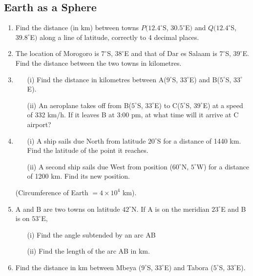 	
	
	\subsection{Earth as a Sphere}
\begin{enumerate}
	\item Find the distance (in km) between towns $P(12.4^\circ$S, $30.5^\circ$E$)$ and $Q(12.4^\circ$S, $39.8^\circ$E$)$ along a line of latitude, correctly to 4 decimal places.

	\item The location of Morogoro is $7^\circ$S, $38^\circ$E and that of Dar es Salaam is $7^\circ$S, $39^\circ$E. Find the distance between the two towns in kilometres.
	
	\item 
		\begin{itemize}
		\item[(i)] Find the distance in kilometres between A($9^\circ$S, $33^\circ$E) and B($5^\circ$S, $33^\circ$E).
		\item[(ii)] An aeroplane takes off from B($5^\circ$S, $33^\circ$E) to C($5^\circ$S, $39^\circ$E) at a speed of 332 km\slash h. If it leaves B at 3:00 pm, at what time will it arrive at C airport?
		\end{itemize}

	\item 
		\begin{itemize}
		\item[(i)] A ship sails due North from latitude $20^\circ$S for a distance of 1440 km. Find the latitude of the point it reaches.
		\item[(ii)] A second ship sails due West from position ($60^\circ$N, $5^\circ$W) for a distance of 1200 km. Find its new position.
		\end{itemize}
		(Circumference of Earth $= 4 \times 10^4$ km).
		
	\item A and B are two towns on latitude $42^\circ$N. If A is on the meridian $23^\circ$E and B is on $53^\circ$E,
		\begin{itemize}
		\item[(i)] Find the angle subtended by an arc AB
		\item[(ii)] Find the length of the arc AB in km.
		\end{itemize}
		
	\item Find the distance in km between Mbeya ($9^\circ$S, $33^\circ$E) and Tabora ($5^\circ$S, $33^\circ$E).
	

\end{enumerate}
